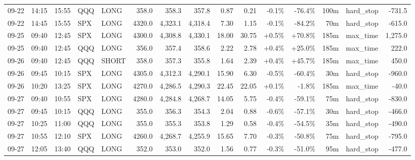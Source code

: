 \documentclass[11pt,a4paper,twoside]{article}
\begin{document}
\begin{landscape}
\begin{center}
\begin{longtable}{>{\color{txtmain}}l l l l l r r r r r r r r >{\color{txtmain}}l r}
09-22 & 14:15 & 15:55 & QQQ & LONG & 358.0 & 358.3 & 357.8 & 0.87 & 0.21 & \textcolor{lossred}{-0.1\%} & \textcolor{lossred}{-76.4\%} & 100m & hard\_stop & \textcolor{lossred}{-731.5} \\
09-22 & 14:45 & 15:55 & SPX & LONG & 4320.0 & 4,323.1 & 4,318.4 & 7.30 & 1.15 & \textcolor{lossred}{-0.1\%} & \textcolor{lossred}{-84.2\%} & 70m & hard\_stop & \textcolor{lossred}{-615.0} \\
09-25 & 09:40 & 12:45 & SPX & LONG & 4300.0 & 4,308.8 & 4,330.1 & 18.00 & 30.75 & \textcolor{wingreen}{+0.5\%} & \textcolor{wingreen}{+70.8\%} & 185m & max\_time & \textcolor{wingreen}{1,275.0} \\
09-25 & 09:40 & 12:45 & QQQ & LONG & 356.0 & 357.4 & 358.6 & 2.22 & 2.78 & \textcolor{wingreen}{+0.4\%} & \textcolor{wingreen}{+25.0\%} & 185m & max\_time & \textcolor{wingreen}{222.0} \\
09-26 & 09:40 & 12:45 & QQQ & SHORT & 358.0 & 357.3 & 355.8 & 1.64 & 2.39 & \textcolor{wingreen}{+0.4\%} & \textcolor{wingreen}{+45.7\%} & 185m & max\_time & \textcolor{wingreen}{450.0} \\
09-26 & 09:45 & 10:15 & SPX & LONG & 4305.0 & 4,312.3 & 4,290.1 & 15.90 & 6.30 & \textcolor{lossred}{-0.5\%} & \textcolor{lossred}{-60.4\%} & 30m & hard\_stop & \textcolor{lossred}{-960.0} \\
09-26 & 10:20 & 13:25 & SPX & LONG & 4270.0 & 4,286.5 & 4,290.3 & 22.45 & 22.05 & \textcolor{wingreen}{+0.1\%} & \textcolor{lossred}{-1.8\%} & 185m & max\_time & \textcolor{lossred}{-40.0} \\
09-27 & 09:40 & 10:55 & SPX & LONG & 4280.0 & 4,284.8 & 4,268.7 & 14.05 & 5.75 & \textcolor{lossred}{-0.4\%} & \textcolor{lossred}{-59.1\%} & 75m & hard\_stop & \textcolor{lossred}{-830.0} \\
09-27 & 09:45 & 10:15 & QQQ & LONG & 355.0 & 356.3 & 354.3 & 2.04 & 0.88 & \textcolor{lossred}{-0.6\%} & \textcolor{lossred}{-57.1\%} & 30m & hard\_stop & \textcolor{lossred}{-466.0} \\
09-27 & 10:25 & 11:00 & QQQ & LONG & 355.0 & 355.3 & 353.8 & 1.29 & 0.58 & \textcolor{lossred}{-0.4\%} & \textcolor{lossred}{-54.5\%} & 35m & hard\_stop & \textcolor{lossred}{-490.0} \\
09-27 & 10:55 & 12:10 & SPX & LONG & 4260.0 & 4,268.7 & 4,255.9 & 15.65 & 7.70 & \textcolor{lossred}{-0.3\%} & \textcolor{lossred}{-50.8\%} & 75m & hard\_stop & \textcolor{lossred}{-795.0} \\
09-27 & 12:05 & 13:40 & QQQ & LONG & 352.0 & 353.0 & 352.0 & 1.56 & 0.77 & \textcolor{lossred}{-0.3\%} & \textcolor{lossred}{-51.0\%} & 95m & hard\_stop & \textcolor{lossred}{-477.0} \\

\end{longtable}
\end{center}
\end{landscape}
\end{document}
